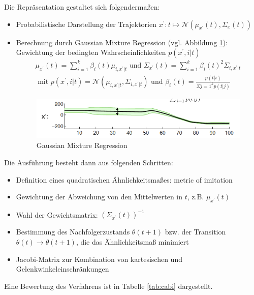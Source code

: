 \newpage
Die Repräsentation gestaltet sich folgendermaßen:
\begin{itemize}
\item Probabilistische Darstellung der Trajektorien $x^\prime: t \mapsto \mathcal{N}(\mu_{x^\prime}(t), \Sigma_x(t))$
\item Berechnung durch Gaussian Mixture Regression (vgl. Abbildung \ref{fig:ch03_gmr}): Gewichtung der bedingten Wahrscheinlichkeiten $p(x^\prime, i|t)$
\begin{align*}
\mu_{x^\prime}(t) = \sum\limits_{i=1}^k \beta_i(t)\mu_{i, x^\prime|t} \text{ und } \Sigma_{x^\prime}(t) = \sum\limits_{i=1}^k \beta_i(t)^2\Sigma_{i, x^\prime|t}\\
\text{ mit } p(x^\prime,i|t) = \mathcal{N}(\mu_{i, x^\prime|t}, \Sigma_{i, x^\prime|t}) \text{ und } \beta_i(t) = \frac{p(t|i)}{\Sigma{j=1}^k p(t|j)}
\end{align*}
\begin{figure}[ht]\centering 
\includegraphics[width=0.6\linewidth]{figures/ch03_gmr.png}
\caption{Gaussian Mixture Regression}
\label{fig:ch03_gmr}
\end{figure}
\end{itemize}
Die Ausführung besteht dann aus folgenden Schritten:
\begin{itemize}
\item Definition eines quadratischen Ähnlichkeitsmaßes: \Gu metric of imitation\Go
\item Gewichtung der Abweichung von den Mittelwerten in $t$, z.B. $\mu_{x^\prime}(t)$
\item Wahl der Gewichtsmatrix: $(\Sigma_{x^\prime}(t))^{-1}$
\item Bestimmung des Nachfolgerzustands $\theta(t+1)$ bzw. der Transition $\theta(t) \rightarrow \theta(t+1)$, die
das Ähnlichkeitsmaß minimiert
\item Jacobi-Matrix zur Kombination von kartesischen und Gelenkwinkeleinschränkungen
\end{itemize}
Eine Bewertung des Verfahrens ist in Tabelle \ref{tab:cabi} dargestellt.
